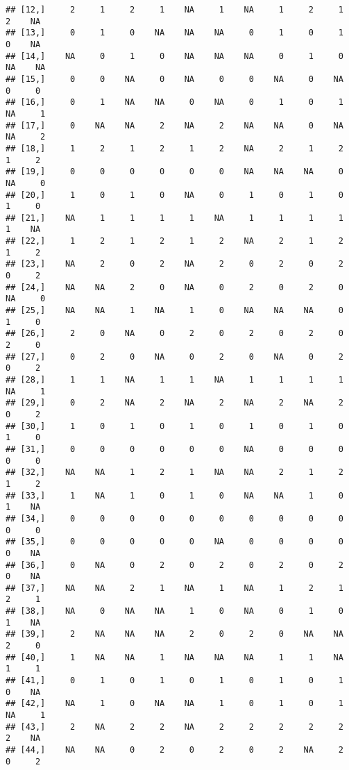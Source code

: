 \documentclass[
]{article}
\begin{document}
\begin{verbatim}
## [12,]     2     1     2     1    NA     1    NA     1     2     1     2    NA
## [13,]     0     1     0    NA    NA    NA     0     1     0     1     0    NA
## [14,]    NA     0     1     0    NA    NA    NA     0     1     0    NA    NA
## [15,]     0     0    NA     0    NA     0     0    NA     0    NA     0     0
## [16,]     0     1    NA    NA     0    NA     0     1     0     1    NA     1
## [17,]     0    NA    NA     2    NA     2    NA    NA     0    NA    NA     2
## [18,]     1     2     1     2     1     2    NA     2     1     2     1     2
## [19,]     0     0     0     0     0     0    NA    NA    NA     0    NA     0
## [20,]     1     0     1     0    NA     0     1     0     1     0     1     0
## [21,]    NA     1     1     1     1    NA     1     1     1     1     1    NA
## [22,]     1     2     1     2     1     2    NA     2     1     2     1     2
## [23,]    NA     2     0     2    NA     2     0     2     0     2     0     2
## [24,]    NA    NA     2     0    NA     0     2     0     2     0    NA     0
## [25,]    NA    NA     1    NA     1     0    NA    NA    NA     0     1     0
## [26,]     2     0    NA     0     2     0     2     0     2     0     2     0
## [27,]     0     2     0    NA     0     2     0    NA     0     2     0     2
## [28,]     1     1    NA     1     1    NA     1     1     1     1    NA     1
## [29,]     0     2    NA     2    NA     2    NA     2    NA     2     0     2
## [30,]     1     0     1     0     1     0     1     0     1     0     1     0
## [31,]     0     0     0     0     0     0    NA     0     0     0     0     0
## [32,]    NA    NA     1     2     1    NA    NA     2     1     2     1     2
## [33,]     1    NA     1     0     1     0    NA    NA     1     0     1    NA
## [34,]     0     0     0     0     0     0     0     0     0     0     0     0
## [35,]     0     0     0     0     0    NA     0     0     0     0     0    NA
## [36,]     0    NA     0     2     0     2     0     2     0     2     0    NA
## [37,]    NA    NA     2     1    NA     1    NA     1     2     1     2     1
## [38,]    NA     0    NA    NA     1     0    NA     0     1     0     1    NA
## [39,]     2    NA    NA    NA     2     0     2     0    NA    NA     2     0
## [40,]     1    NA    NA     1    NA    NA    NA     1     1    NA     1     1
## [41,]     0     1     0     1     0     1     0     1     0     1     0    NA
## [42,]    NA     1     0    NA    NA     1     0     1     0     1    NA     1
## [43,]     2    NA     2     2    NA     2     2     2     2     2     2    NA
## [44,]    NA    NA     0     2     0     2     0     2    NA     2     0     2

\end{verbatim}
\end{document}

